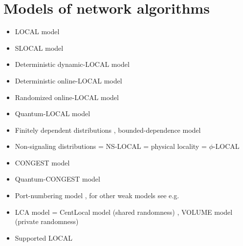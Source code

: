 \documentclass[a4paper,11pt]{article}
\begin{document}
\section{Models of network algorithms}
\begin{itemize}
    \item LOCAL model \cite{linial-1992-locality-in-distributed-graph-algorithms,peleg-2000-distributed-computing-a-locality-sensitive}
    \item SLOCAL model \cite{ghaffari-kuhn-maus-2017-on-the-complexity-of-local}
    \item Deterministic dynamic-LOCAL model \cite{akbari-eslami-etal-2023-locality-in-online-dynamic}
    \item Deterministic online-LOCAL model \cite{akbari-eslami-etal-2023-locality-in-online-dynamic}
    \item Randomized online-LOCAL model \cite{akbari-coiteux-roy-etal-2025-online-locality-meets}
    \item Quantum-LOCAL model \cite{gavoille-kosowski-markiewicz-2009-what-can-be-observed,arfaoui-fraigniaud-2014-what-can-be-computed-without}
    \item Finitely dependent distributions \cite{burton-goulet-meester-1993-on-1-dependent-processes-and,holroyd-liggett-2016-finitely-dependent-coloring}, bounded-dependence model \cite{akbari-coiteux-roy-etal-2025-online-locality-meets}
    \item Non-signaling distributions = NS-LOCAL = physical locality = $\phi$-LOCAL \cite{gavoille-kosowski-markiewicz-2009-what-can-be-observed,arfaoui-fraigniaud-2014-what-can-be-computed-without}
    \item CONGEST model \cite{peleg-2000-distributed-computing-a-locality-sensitive}
    \item Quantum-CONGEST model \cite{elkin-klauck-etal-2014-can-quantum-communication-speed}
    \item Port-numbering model \cite{angluin-1980-local-and-global-properties-in-networks-of}, for other weak models see e.g.\ \cite{hella-jarvisalo-etal-2015-weak-models-of-distributed}
    \item LCA model = CentLocal model (shared randomness) \cite{rubinfeld-tamir-etal-2011-fast-local-computation}, VOLUME model (private randomness) \cite{rosenbaum-suomela-2020-seeing-far-vs-seeing-wide-volume}
    \item Supported LOCAL \cite{schmid-suomela-2013-exploiting-locality-in-distributed}
\end{itemize}
\end{document}
